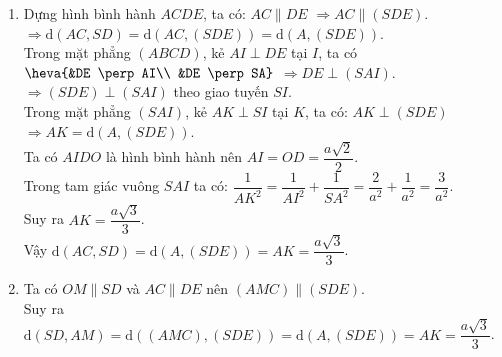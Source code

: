 \begin{bt}
{\begin{enumerate}
			Vậy $\mathrm{d}(SC, BD) = OH = \dfrac{a\sqrt{6}}{6}$.
			\item Dựng hình bình hành $ACDE$, ta có: $AC \parallel DE$ $\Rightarrow AC \parallel (SDE)$.\\
			$\Rightarrow \mathrm{d}(AC, SD) = \mathrm{d}(AC, (SDE)) = \mathrm{d}(A, (SDE))$.\\
			Trong mặt phẳng $(ABCD)$, kẻ $AI \perp DE$ tại $I$, ta có $\heva{&DE \perp AI\\ &DE \perp SA}$ $\Rightarrow DE \perp (SAI)$.\\
			$\Rightarrow (SDE) \perp (SAI)$ theo giao tuyến $SI$.\\
			Trong mặt phẳng $(SAI)$, kẻ $AK \perp SI$ tại $K$, ta có: $AK \perp (SDE)$ $\Rightarrow AK = \mathrm{d}(A, (SDE))$.\\
			Ta có $AIDO$ là hình bình hành nên $AI = OD = \dfrac{a\sqrt{2}}{2}$.\\
			Trong tam giác vuông $SAI$ ta có: $\dfrac{1}{AK^2} = \dfrac{1}{AI^2} + \dfrac{1}{SA^2} = \dfrac{2}{a^2} + \dfrac{1}{a^2} = \dfrac{3}{a^2}$.\\
			Suy ra $AK = \dfrac{a\sqrt{3}}{3}$.\\
			Vậy $\mathrm{d}(AC, SD) = \mathrm{d}(A, (SDE)) = AK = \dfrac{a\sqrt{3}}{3}$.
			\item Ta có $OM \parallel SD$ và $AC \parallel DE$ nên $(AMC) \parallel (SDE)$.\\
			Suy ra $\mathrm{d}(SD, AM) = \mathrm{d}((AMC), (SDE)) = \mathrm{d}(A, (SDE)) = AK = \dfrac{a\sqrt{3}}{3}$.
		\end{enumerate}
	}
\end{bt}

